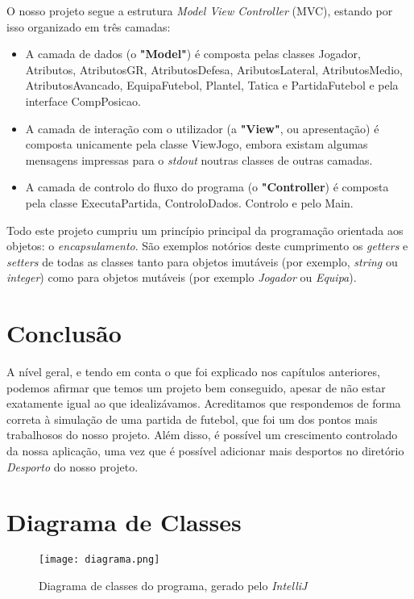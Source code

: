 \documentclass[a4paper]{report}
\begin{document}
	O nosso projeto segue a estrutura \textit{Model View Controller} (MVC), estando por isso organizado em três camadas:
	\begin{itemize}
		\item A camada de dados (o \textbf{"Model"}) é composta pelas classes Jogador, Atributos, AtributosGR, AtributosDefesa, AributosLateral, AtributosMedio, AtributosAvancado, EquipaFutebol, Plantel, Tatica e PartidaFutebol e pela interface CompPosicao.
		\item A camada de interação com o utilizador (a \textbf{"View"}, ou apresentação) é composta unicamente pela classe ViewJogo, embora existam algumas mensagens impressas para o \textit{stdout} noutras classes de outras camadas.
		\item A camada de controlo do fluxo do programa (o \textbf{"Controller}) é composta pela classe ExecutaPartida, ControloDados. Controlo e pelo Main.
	\end{itemize}
	
	Todo este projeto cumpriu um princípio principal da programação orientada aos objetos: o \textit{encapsulamento}. São exemplos notórios deste cumprimento os \textit{getters} e \textit{setters} de todas as classes tanto para objetos imutáveis (por exemplo, \textit{string} ou \textit{integer}) como para objetos mutáveis (por exemplo \textit{Jogador} ou \textit{Equipa}).
    
      

	
	

	\chapter{Conclusão}

	A nível geral, e tendo em conta o que foi explicado nos capítulos anteriores, podemos afirmar que temos um projeto bem conseguido, apesar de não estar exatamente igual ao que idealizávamos. Acreditamos que respondemos de forma correta à simulação de uma partida de futebol, que foi um dos pontos mais trabalhosos do nosso projeto. Além disso, é possível um crescimento controlado da nossa aplicação, uma vez que é possível adicionar mais desportos no diretório \textit{Desporto} do nosso projeto.
	
	\appendix
	
	\chapter{Diagrama de Classes}
	\begin{figure}[H]
		\begin{center}
			\texttt{[image: diagrama.png]}
			\caption{Diagrama de classes do programa, gerado pelo \emph{IntelliJ}}
		\end{center}
	\end{figure}
\end{document}
